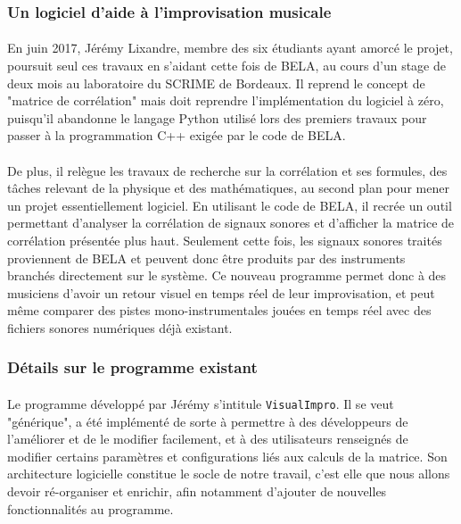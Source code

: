 \subsubsection{Un logiciel d'aide à l'improvisation musicale}
\paragraph{}
En juin 2017, Jérémy Lixandre, membre des six étudiants ayant amorcé
le projet, poursuit seul ces travaux en s'aidant cette fois de BELA,
au cours d'un stage de deux mois au laboratoire du SCRIME de
Bordeaux. Il reprend le concept de "matrice de corrélation" mais
doit reprendre l'implémentation du logiciel à zéro, puisqu'il
abandonne le langage Python utilisé lors des premiers travaux pour
passer à la programmation C++ exigée par le code de BELA.
\paragraph{}
De plus, il relègue les travaux de recherche sur la corrélation et ses
formules, des tâches relevant de la physique et des mathématiques, au
second plan pour mener un projet essentiellement logiciel. En
utilisant le code de BELA, il recrée un outil permettant d'analyser la
corrélation de signaux sonores et d'afficher la matrice de corrélation
présentée plus haut. Seulement cette fois, les signaux sonores traités
proviennent de BELA et peuvent donc être produits par des instruments
branchés directement sur le système. Ce nouveau programme permet donc
à des musiciens d'avoir un retour visuel en temps réel de leur
improvisation, et peut même comparer des pistes mono-instrumentales
jouées en temps réel avec des fichiers sonores numériques déjà
existant.

\subsubsection{Détails sur le programme existant}
\paragraph{}
Le programme développé par Jérémy s'intitule \verb!VisualImpro!. Il se
veut "générique", a été implémenté de sorte à permettre à des
développeurs de l'améliorer et de le modifier facilement, et à des
utilisateurs renseignés de modifier certains paramètres et
configurations liés aux calculs de la matrice. Son architecture
logicielle constitue le socle de notre travail, c'est elle que nous
allons devoir ré-organiser et enrichir, afin notamment d'ajouter de
nouvelles fonctionnalités au programme.
